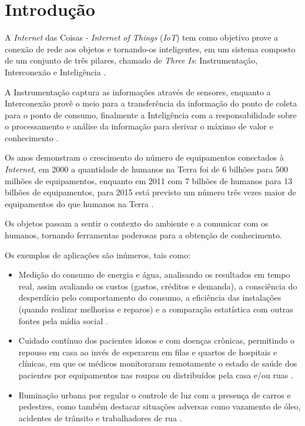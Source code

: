 %

\chapter{Introdução}

A \textit{Internet} das Coisas - \textit{Internet of Things} (\textit{IoT}) tem
como objetivo prove a conexão de rede aos objetos e tornando-os inteligentes,
em um sistema composto de um conjunto de três pilares, chamado de \textit{Three
    Is}: Instrumentação, Interconexão e Inteligência \cite{mqttibm2012}.

A Instrumentação captura as informações através de sensores, enquanto a
Interconexão provê o meio para a transferência da informação do ponto de coleta
para o ponto de consumo, finalmente a Inteligência com a responsabilidade sobre
o processamento e análise da informação para derivar o máximo de valor e
conhecimento \cite{mqttibm2012}.

Os anos demonstram o crescimento do número de equipamentos conectados à
\textit{Internet}, em 2000 a quantidade de humanos na Terra foi de 6 bilhões
para 500 milhões de equipamentos, enquanto em 2011 com 7 bilhões de humanos
para 13 bilhões de equipamentos, para 2015 está previsto um número três vezes
maior de equipamentos do que humanos na Terra \cite{mirkopresser2012}.

Os objetos passam a sentir o contexto do ambiente e a comunicar com os humanos,
tornando ferramentas poderosas para a obtenção de conhecimento.

Os exemplos de aplicações são inúmeros, tais como:

\begin{itemize}

    \item Medição do consumo de energia e água, analisando os resultados em
    tempo real, assim avaliando os custos (gastos, créditos e demanda), a
    consciência do desperdício pelo comportamento do consumo, a eficiência das
    instalações (quando realizar melhorias e reparos) e a comparação
    estatística com outras fontes pela mídia social \cite{mirkopresser2012}.

    \item Cuidado contínuo dos pacientes idosos e com doenças crônicas,
    permitindo o repouso em casa ao invés de esperarem em filas e quartos de
    hospitais e clínicas, em que os médicos monitoraram remotamente o estado de
    saúde dos pacientes por equipamentos nas roupas ou distribuídos pela casa
    e/ou ruas \cite{mirkopresser2012}.

    \item Iluminação urbana por regular o controle de luz com a presença de
    carros e pedestres, como também destacar situações adversas como vazamento
    de óleo, acidentes de trânsito e trabalhadores de rua
    \cite{mirkopresser2012}.

\end{itemize}

